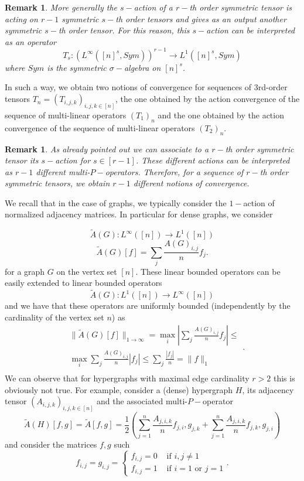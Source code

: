 \documentclass[11pt]{article}
\newtheorem{remark}[theorem]{Remark}
\begin{document}
\begin{remark}
More generally the $s-$action of a $r-$th order symmetric tensor is acting on $r-1$ symmetric $s-$th order tensors and gives as an output another symmetric $s-$th order tensor. For this reason, this $s-$action can be interpreted as an operator
$$
T_s:(L^{\infty}([n]^s,Sym))^{r-1}\longrightarrow L^{1}([n]^s,Sym)
$$
where  $Sym$ is the symmetric $\sigma-$algebra on $[n]^s$.
\end{remark}

In such a way, we obtain two notions of convergence for sequences of $3$rd-order tensors $T_n=(T_{i,j,k})_{i,j,k\in [n]}$, the one obtained by the action convergence of the sequence of multi-linear operators $(T_1)_n$ and the one obtained by the action convergence of the sequence of multi-linear operators $(T_2)_n$.

\begin{remark}
As already pointed out we can associate to a $r-$th order symmetric tensor its $s-$action for $s\in[r-1]$. These different actions can be interpreted as $r-1$ different multi-$P-$operators. Therefore, for a sequence of $r-$th order symmetric tensors, we obtain $r-1$ different notions of convergence. %
\end{remark}

We recall that in the case of graphs, we typically consider the $1-$action of normalized adjacency matrices. In particular for dense graphs, we consider

$$
\widetilde{A}(G):L^{\infty}([n])\longrightarrow L^{1}([n])
$$
$$
\widetilde{A}(G)[f]=\sum_{j}\frac{A(G)_{i,j}}{n}f_j.
$$
for a graph $G$ on the vertex set $[n]$. These linear bounded operators can be easily extended to linear bounded operators 
$$
\widetilde{A}(G):L^1{([n])}\longrightarrow L^{\infty}([n])
$$
and we have that these operators are uniformly bounded (independently by the cardinality of the vertex set $n$) as 
$$
\begin{aligned}
&\|\widetilde{A}(G)[f]\|_{1\rightarrow\infty}=\max_i|\sum_{j}\frac{A(G)_{i,j}}{n}f_j|\leq\\&
\max_i\sum_{j}\frac{A(G)_{i,j}}{n}|f_j|\leq\sum_{j}\frac{|f_j|}{n}= \|f\|_1 \\ &
\end{aligned}.
$$
We can observe that for hypergraphs with maximal edge cardinality $r>2$ this is obviously not true. For example, consider a (dense) hypergraph $H$, its adjacency tensor $(A_{i,j,k})_{i,j,k\in [n]}$ and the associated multi-$P-$operator 
$$\widetilde{A}(H)[f,g]=\widetilde{A}[f,g]=\frac{1}{2}(\sum^n_{j=1}\frac{A_{j,i,k}}{n}f_{j,i},g_{j,k} +\sum^n_{j=1}\frac{A_{j,i,k}}{n}f_{j,k},g_{j,i})
$$
 and consider the matrices $f,g$ such $$f_{i,j}=g_{i,j}=\begin{cases}
f_{i,j}=0 & \text{ if } i,j\neq 1 \\
f_{i,j}=1 & \text{ if } i=1 \text{ or }j=1
\end{cases}.
$$
\end{document}
